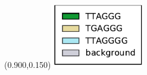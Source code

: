 \documentclass{article}
\begin{document}
\begin{textblock}{13}(0.900,0.150)\includegraphics[width=1.60in,keepaspectratio]{Figure_S3/densityplot-q_arm-legend.pdf}\end{textblock}
\end{document}
